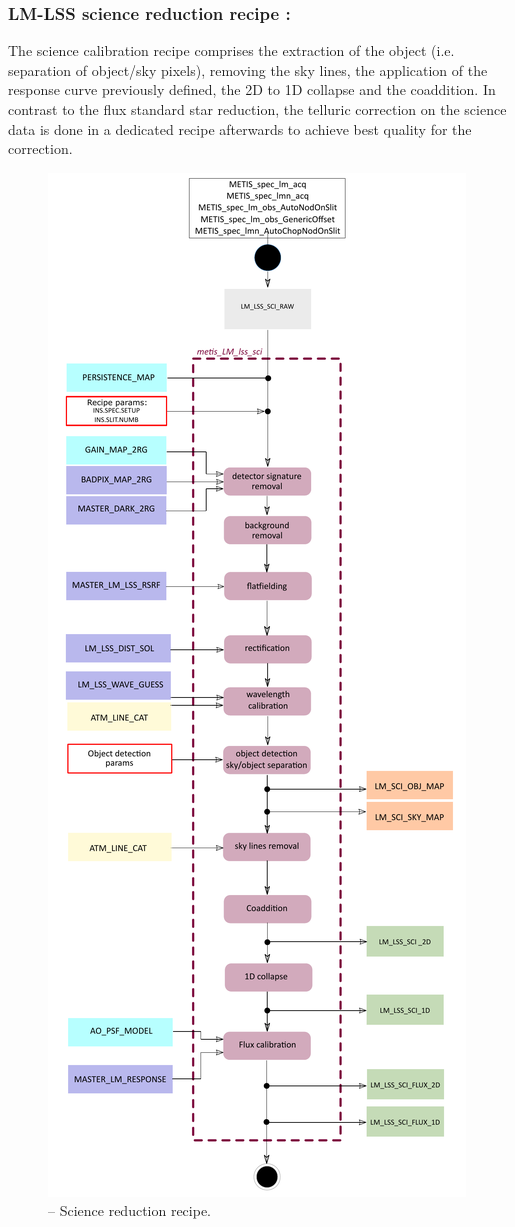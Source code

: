 \subsubsection{LM-LSS science reduction recipe :}\label{rec:lsslmsci}
The science calibration recipe comprises the extraction of the object (i.e. separation of object/sky pixels), removing the sky lines, the application of the response curve previously defined, the 2D to 1D collapse and the coaddition. In contrast to the flux standard star reduction, the telluric correction on the science data is done in a dedicated recipe afterwards to achieve best quality for the correction.
\begin{figure}[ht]
  \centering
  \includegraphics[width=0.38\textheight]{figures/metis_lm_lss_sci_v0.74.pdf}
  \caption[Recipe: ]{ --
    Science reduction recipe.}
  \label{Fig:rec_lm_lss_sci}
\end{figure}
